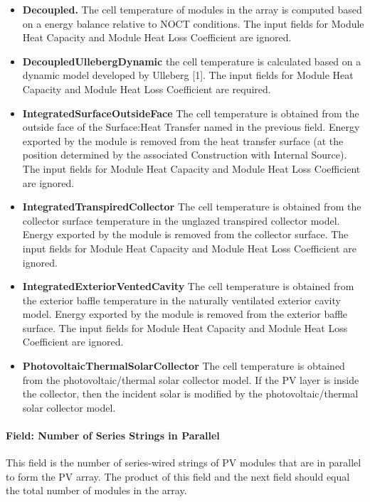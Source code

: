 \begin{itemize}
\item
  \textbf{Decoupled.} The cell temperature of modules in the array is computed based on a energy balance relative to NOCT conditions. The input fields for Module Heat Capacity and Module Heat Loss Coefficient are ignored.
\item
  \textbf{DecoupledUllebergDynamic} the cell temperature is calculated based on a dynamic model developed by Ulleberg {[}1{]}. The input fields for Module Heat Capacity and Module Heat Loss Coefficient are required.
\item
  \textbf{IntegratedSurfaceOutsideFace} The cell temperature is obtained from the outside face of the Surface:Heat Transfer named in the previous field. Energy exported by the module is removed from the heat transfer surface (at the position determined by the associated Construction with Internal Source). The input fields for Module Heat Capacity and Module Heat Loss Coefficient are ignored.
\item
  \textbf{IntegratedTranspiredCollector} The cell temperature is obtained from the collector surface temperature in the unglazed transpired collector model. Energy exported by the module is removed from the collector surface. The input fields for Module Heat Capacity and Module Heat Loss Coefficient are ignored.
\item
  \textbf{IntegratedExteriorVentedCavity} The cell temperature is obtained from the exterior baffle temperature in the naturally ventilated exterior cavity model. Energy exported by the module is removed from the exterior baffle surface. The input fields for Module Heat Capacity and Module Heat Loss Coefficient are ignored.
\item
  \textbf{PhotovoltaicThermalSolarCollector} The cell temperature is obtained from the photovoltaic/thermal solar collector model. If the PV layer is inside the collector, then the incident solar is modified by the photovoltaic/thermal solar collector model.
\end{itemize}

\paragraph{Field: Number of Series Strings in Parallel}\label{field-number-of-series-strings-in-parallel}

This field is the number of series-wired strings of PV modules that are in parallel to form the PV array. The product of this field and the next field should equal the total number of modules in the array.

